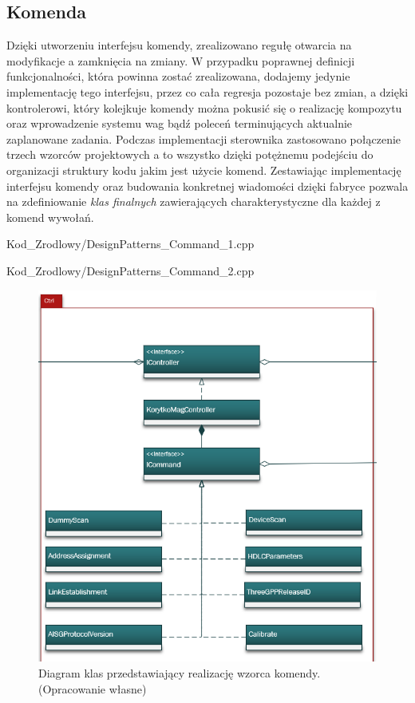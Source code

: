     \subsection{Komenda}
        Dzięki utworzeniu interfejsu komendy, zrealizowano regułę otwarcia na modyfikacje a zamknięcia na zmiany.
        W przypadku poprawnej definicji funkcjonalności, która powinna zostać zrealizowana, dodajemy jedynie implementację tego interfejsu,
        przez co cała regresja pozostaje bez zmian, a dzięki kontrolerowi, który kolejkuje komendy można pokusić się o realizację kompozytu oraz
        wprowadzenie systemu wag bądź poleceń terminujących aktualnie zaplanowane zadania.
        Podczas implementacji sterownika zastosowano połączenie trzech wzorców projektowych a to wszystko dzięki potężnemu podejściu do organizacji
        struktury kodu jakim jest użycie komend. Zestawiając implementację interfejsu komendy oraz budowania konkretnej wiadomości dzięki fabryce
        pozwala na zdefiniowanie \textit{klas finalnych} zawierających charakterystyczne dla każdej z komend wywołań. 
    \newpage
        
            {Kod_Zrodlowy/DesignPatterns_Command_1.cpp}
        
            {Kod_Zrodlowy/DesignPatterns_Command_2.cpp}
        \begin{figure}[h!]
            \centering
            \includegraphics[scale=0.90]{Obrazki/DiagramyKlas/Ctrl.png}
            \caption{Diagram klas przedstawiający realizację wzorca komendy.
                \newline(Opracowanie własne)}
        \end{figure}
    \newpage
